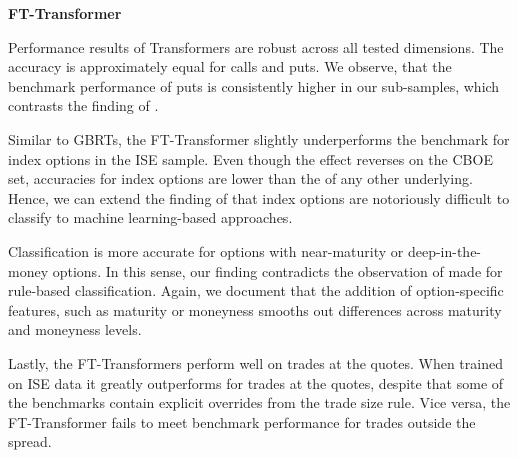 \clearpage

\textbf{FT-Transformer}

Performance results of Transformers are robust across all tested dimensions. The accuracy is approximately equal for calls and puts. We observe, that the benchmark performance of puts is consistently higher in our sub-samples, which contrasts the finding of \textcite[][22]{grauerOptionTradeClassification2022}.

Similar to \glspl{GBRT}, the FT-Transformer slightly underperforms the benchmark for index options in the \gls{ISE} sample. Even though the effect reverses on the \gls{CBOE} set, accuracies for index options are lower than the of any other underlying. Hence, we can extend the finding of \textcites[][22]{grauerOptionTradeClassification2022}[][9]{savickasInferringDirectionOption2003} that index options are notoriously difficult to classify to machine learning-based approaches.

Classification is more accurate for options with near-maturity or deep-in-the-money options. In this sense, our finding contradicts the observation of \textcite[][891]{savickasInferringDirectionOption2003} made for rule-based classification. Again, we document that the addition of option-specific features, such as maturity or moneyness smooths out differences across maturity and moneyness levels.

Lastly, the FT-Transformers perform well on trades at the quotes. When trained on \gls{ISE} data it greatly outperforms for trades at the quotes, despite that some of the benchmarks contain explicit overrides from the trade size rule. Vice versa, the FT-Transformer fails to meet benchmark performance for trades outside the spread.


